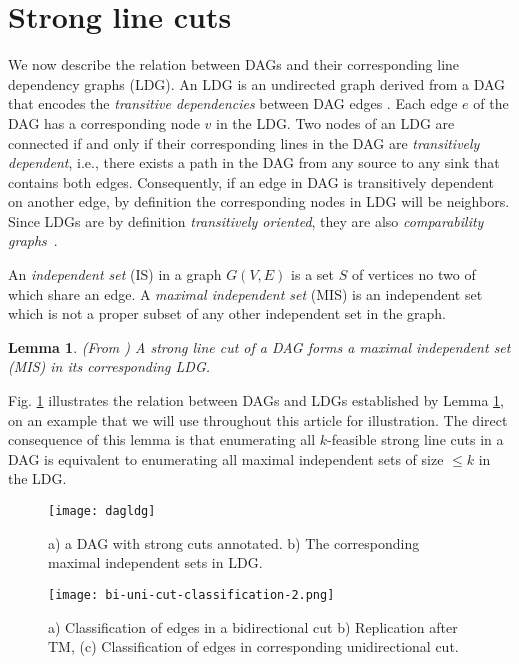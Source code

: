 \documentclass[journal]{IEEEtran}
\newtheorem{lemma}{Lemma}
\begin{document}
\section{Strong line cuts}

We now describe the relation between DAGs and their corresponding line dependency graphs (LDG).  An LDG is an undirected graph derived from a DAG that encodes the \emph{transitive dependencies} between DAG edges \cite{kagaris1999maximum}. Each edge $e$ of the DAG has a corresponding node $v$ in the LDG. Two nodes of an LDG are connected if and only if their corresponding lines in the DAG are \emph{transitively dependent}, i.e., there exists a path in the DAG from any source to any sink that contains both edges. Consequently, if an edge in DAG is transitively dependent on another edge, by definition the corresponding nodes in LDG will be neighbors. Since LDGs are by definition \emph{transitively oriented}, they are also \emph{comparability graphs}~\cite{golumbic2004algorithmic}.

An \emph{independent set} (IS) in a graph $G(V,E)$ is a set $S$ of vertices no two of which share an edge. A \emph{maximal independent
  set} (MIS) is an independent set which is not a proper subset of any other independent set in the graph. 

\begin{lemma}
\label{lem:mis}
(From \cite{kagaris1999maximum}) A strong line cut of a DAG forms a maximal independent set (MIS) in its
corresponding LDG.
\end{lemma}


Fig. \ref{fig:cut} illustrates the relation between DAGs and LDGs established by Lemma \ref{lem:mis}, on an example that we will use throughout this article  for illustration. The direct consequence of this lemma is that enumerating all $k$-feasible strong line cuts in a DAG is equivalent to enumerating all maximal independent sets of size $\leq k$ in the LDG.

\begin{figure}[h]
\centering
\texttt{[image: dagldg]}
\caption{\label{fig:cut} a) a DAG with strong cuts annotated. b) The corresponding  maximal independent sets in LDG.}
\end{figure}

\begin{figure*}[t]
\centering
\texttt{[image: bi-uni-cut-classification-2.png]}
\caption{\label{fig:bi-uni-cut-classification} a) Classification of edges in a bidirectional cut b) Replication after TM, (c) Classification of edges in corresponding unidirectional cut.}
\end{figure*}
\end{document}
